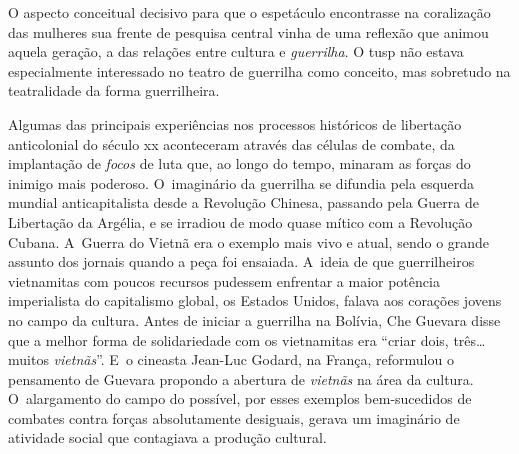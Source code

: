 
\subject{Imaginário guerrilheiro}

O aspecto conceitual decisivo para que o espetáculo encontrasse na
coralização das mulheres sua frente de pesquisa central vinha de uma
reflexão que animou aquela geração, a das relações entre cultura e
{\it guerrilha}. O {\sc tusp} não estava especialmente interessado no
teatro de guerrilha como conceito, mas sobretudo na teatralidade
da forma guerrilheira.

Algumas das principais experiências nos processos históricos de
libertação anticolonial do século {\sc xx} aconteceram através das células de
combate, da implantação de {\it focos} de luta que, ao longo do tempo,
minaram as forças do inimigo mais poderoso. O~imaginário da
guerrilha se difundia pela esquerda mundial anticapitalista desde a
Revolução Chinesa, passando pela Guerra de Libertação da Argélia, e se
irradiou de modo quase mítico com a Revolução Cubana. A~Guerra do Vietnã
era o exemplo mais vivo e atual, sendo o grande assunto dos jornais
quando a peça foi ensaiada. A~ideia de que guerrilheiros vietnamitas com
poucos recursos pudessem enfrentar a maior potência imperialista do
capitalismo global, os Estados Unidos, falava aos corações jovens no
campo da cultura. Antes de iniciar a guerrilha na Bolívia, Che Guevara 
disse que a melhor forma de solidariedade com os vietnamitas era “criar
dois, três\ldots{} muitos {\it vietnãs}”. E~o cineasta Jean-Luc Godard, na
França, reformulou o pensamento de Guevara propondo a abertura de
{\it vietnãs} na área da cultura. O~alargamento do campo do possível,
por esses exemplos bem-sucedidos de combates contra forças absolutamente
desiguais, gerava um imaginário de atividade social que contagiava a
produção cultural.

